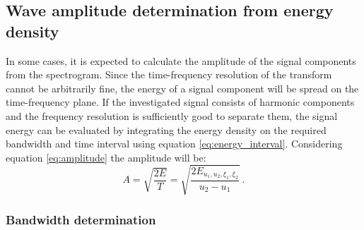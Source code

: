 \documentclass[a4paper,12pt,oneside]{article}
\begin{document}
\subsection{Wave amplitude determination from energy density}

In some cases, it is expected to calculate the amplitude of the signal components from the spectrogram. Since the time-frequency resolution of the transform cannot be arbitrarily fine, the energy of a signal component will be spread on the time-frequency plane. If the investigated signal consists of harmonic components and the frequency resolution is sufficiently good to separate them, the signal energy can be evaluated by integrating the energy density on the required bandwidth and time interval using equation \eqref{eq:energy_interval}. Considering equation \eqref{eq:amplitude} the amplitude will be:
\begin{equation}\label{eq:amplitude2}
  A = \sqrt{\frac{2E}{T}} = \sqrt{\frac{2E_{u_1, u_2, \xi_1, \xi_2}}{u_2-u_1}} \ .
\end{equation}

\subsubsection{Bandwidth determination}
\end{document}
